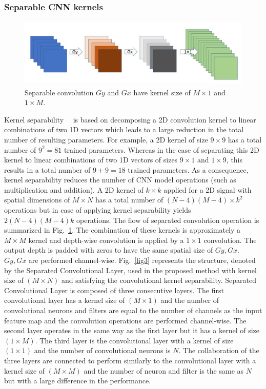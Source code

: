 \subsubsection{Separable CNN kernels}
\begin{figure}
\begin{center}
\includegraphics[height=33mm,width=14.0cm]{Figures/fig2.jpg}
\caption{Separable convolution  $Gy$ and $Gx$ have kernel size of $M\times1$ and $1 \times M$.}
\label{fig2}\end{center}\end{figure}


    
Kernel separability~\cite{rigamonti2013learning}~\cite{szegedy2017inception} is based on decomposing a 2D convolution kernel to linear combinations of two 1D vectors which leads to a large reduction in the total number of resulting parameters. For example, a 2D kernel of size $9 \times 9$ has a total number of $9^2 = 81$  trained parameters. Whereas in the case of separating this 2D kernel to linear combinations of two 1D vectors of sizes $9 \times 1$ and $1 \times 9$, this results in a total number of  $9 + 9 = 18$ trained parameters. As a consequence, kernel separability reduces the number of CNN model operations (such as multiplication and addition). A  2D kernel of $k \times k$ applied for a 2D signal with spatial dimensions of $ M \times N$ has a total number of  $(N-4)(M-4)\times k^2$ operations but in case of applying kernel separability yields $2(N-4)(M-4)k$ operations. The flow of separated convolution operation is summarized in Fig.~\ref{fig2}. The combination of these kernels is approximately a $M\times M$ kernel and depth-wise convolution is applied by a $1\times1$ convolution. The output depth is padded with zeros to have the same spatial size of  $Gy, Gx$. $Gy, Gx$ are performed channel-wise. Fig.~\ref{fig3} represents the structure, denoted by the Separated Convolutional Layer, used in the proposed method with kernel size of $(M\times N)$ and satisfying the convolutional kernel separability. Separated Convolutional Layer is composed of three consecutive layers. The first convolutional layer has a kernel size of $(M\times1)$ and the number of convolutional neurons and filters are equal to the number of channels as the input feature map and the convolution operations are performed channel-wise. The second layer operates in the same way as the first layer but it has a kernel of size $(1\times M)$. The third layer is the convolutional layer with a kernel of size $(1\times1)$ and the number of convolutional neurons is $N$. The collaboration of the three layers are connected to perform similarly to the convolutional layer with a kernel size of $(M\times M)$ and the number of neuron and filter is the same as $N$ but with a large difference in the performance.


